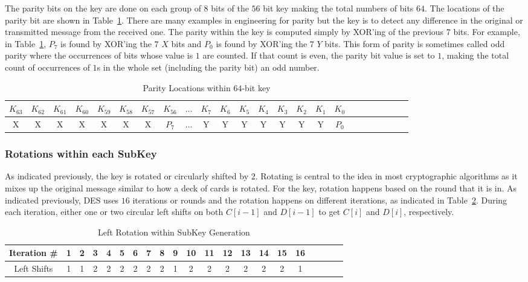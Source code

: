 \documentclass{article}
\begin{document}
The parity bits on the key are done on each group of $8$ bits of the
$56$ bit key making
the total numbers of bits $64$. The locations of the parity bit are
shown in Table~\ref{parity.tbl}.  There are many examples in
engineering for parity but the key is to detect any difference in the
original or transmitted message from the received one.  The parity
within the key is computed simply by XOR'ing of the previous 7 bits.
For example, in Table~\ref{parity.tbl}, $P_7$ is found by XOR'ing the
$7$ $X$ bits and $P_0$ is found by XOR'ing the $7$ $Y$ bits.  This
form of parity is sometimes called odd parity where the occurrences
of bits whose value is $1$ are counted. If that count is even, the parity
bit value is set to $1$, making the total count of occurrences of $1$s in
the whole set (including the parity bit) an odd number.
\begin{table}
  \centering
  {\scriptsize
\begin{tabular}{|c|c|c|c|c|c|c|c|c|c|c|c|c|c|c|c|c|c|c|c|c|c|c|c|} \hline
  $K_{63}$ & $K_{62}$ & $K_{61}$ & $K_{60}$ & $K_{59}$ & $K_{58}$ &
  $K_{57}$ & $K_{56}$ & $\ldots$ &
  $K_{7}$ & $K_{6}$ & $K_{5}$ & $K_{4}$ & $K_{3}$ & $K_{2}$ &
  $K_{1}$ & $K_{0}$ \\ \hline \hline
  X & X & X & X & X & X & X & $P_7$ & $\ldots$ & Y & Y & Y & Y & Y & Y & Y
  & $P_0$ \\ \hline
\end{tabular}
  }
  \caption{Parity Locations within $64$-bit key}
  \label{parity.tbl}
\end{table}

\subsubsection{Rotations within each SubKey}

As indicated previously, the key is rotated or circularly shifted by
$2$.  Rotating is central to the idea in most cryptographic algorithms
as it mixes up the original message similar to how a deck of cards is
rotated.  For the key, rotation happens based on the round that it is
in.  As indicated previously, DES uses $16$ iterations or rounds
and the rotation
happens on different iterations, as indicated in Table~\ref{rotateK.tbl}.
During each iteration, either one or two
circular left shifts on both $C[i-1]$ and 
$D[i-1]$ to get $C[i]$ and $D[i]$, respectively.
\begin{table}
  \centering
  \begin{tabular}{|c|c|c|c|c|c|c|c|c|c|c|c|c|c|c|c|c|c|c|c|c|}\hline
    Iteration \# & 1 & 2 & 3 & 4 & 5 & 6 & 7 &  8 & 9 & 10 & 11 & 12 &
    13 & 14 & 15 & 16 \\ \hline \hline    
    Left Shifts & 1 & 1 & 2 & 2 & 2 & 2 & 2 & 2 & 1 & 2 & 2 & 2 & 2 &
    2 & 2 & 1 \\ \hline
  \end{tabular}
  \caption{Left Rotation within SubKey Generation}
  \label{rotateK.tbl}
\end{table}
\end{document}

